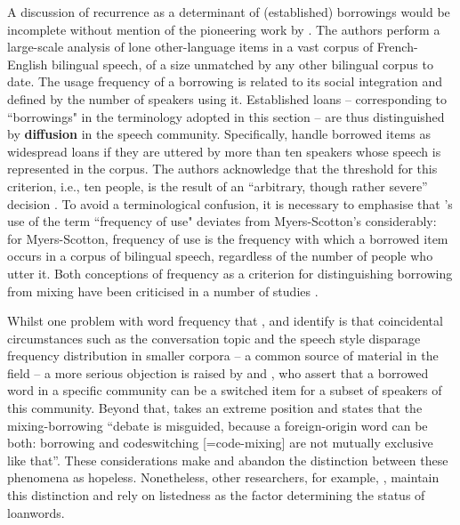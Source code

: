 A discussion of recurrence as a determinant of (established) borrowings would be incomplete without mention of the pioneering work by \citet{poplack-etal-1988}. The authors perform a large-scale analysis of lone other-language items in a vast corpus of French-English bilingual speech, of a size unmatched by any other bilingual corpus to date. The usage frequency of a borrowing is related to its social integration and defined by the number of speakers using it. Established loans -- corresponding to ``borrowings" in the terminology adopted in this section -- are thus distinguished by \textbf{diffusion} in the speech community. Specifically, \citet[55]{poplack-etal-1988} handle borrowed items as widespread loans if they are uttered by more than ten speakers whose speech is represented in the corpus. The authors acknowledge that the threshold for this criterion, i.e., ten people, is the result of an ``arbitrary, though rather severe'' decision \citep[100]{poplack-etal-1988}. To avoid a terminological confusion, it is necessary to emphasise that \citeauthor[]{poplack-etal-1988}'s use of the term ``frequency of use" deviates from Myers-Scotton's considerably: for Myers-Scotton, frequency of use is the frequency with which a borrowed item occurs in a corpus of bilingual speech, regardless of the number of people who utter it. Both conceptions of frequency as a criterion for distinguishing borrowing from mixing have been criticised in a number of studies \citep[e.g.,][]{haust-codeswitching-1995, boumans-syntax-1998,muhamedowa-untersuchung-2006, stammers-deuchar-2012}.

Whilst one problem with word frequency that \citet[49]{haust-codeswitching-1995}, \citet[57]{boumans-syntax-1998} and \citet[46]{muhamedowa-untersuchung-2006} identify is that coincidental circumstances such as the conversation topic and the speech style disparage frequency distribution in smaller corpora -- a common source of material in the field -- a more serious objection is raised by \citet[57]{boumans-syntax-1998} and \citet{backus-13}, who assert that a borrowed word in a specific community can be a switched item for a subset of speakers of this community. Beyond that, \citet[][29]{backus-13} takes an extreme position and states that the mixing-borrowing ``debate is misguided, because a foreign-origin word can be both: borrowing and codeswitching [=code-mixing] are not mutually exclusive like that''. These considerations make \citet[96--97]{backus-two-1996} and \citet[58--60]{boumans-syntax-1998} abandon the distinction between these phenomena as hopeless. Nonetheless, other researchers, for example,  \citet[][]{muhamedowa-untersuchung-2006}, maintain this distinction and rely on listedness as the factor determining the status of loanwords.

